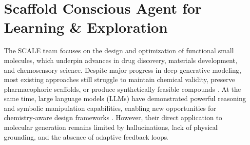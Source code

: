 








\section{Scaffold Conscious Agent for Learning \& Exploration}

The SCALE team focuses on the design and optimization of functional small molecules, which underpin advances in drug discovery, materials development, and chemosensory science. Despite major progress in deep generative modeling, most existing approaches still struggle to maintain chemical validity, preserve pharmacophoric scaffolds, or produce synthetically feasible compounds \cite{sanchez2018inverse}. At the same time, large language models (LLMs) have demonstrated powerful reasoning and symbolic manipulation capabilities, enabling new opportunities for chemistry-aware design frameworks \cite{elton2019deep}. However, their direct application to molecular generation remains limited by hallucinations, lack of physical grounding, and the absence of adaptive feedback loops.

